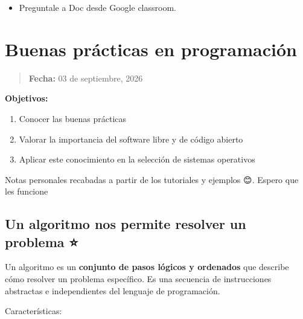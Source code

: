 \documentclass[
  spanish,
  12pt,
  letterpaper,
  DIV=11,
  numbers=noendperiod]{scrreprt}
\providecommand{\tightlist}{%
  \setlength{\itemsep}{0pt}\setlength{\parskip}{0pt}}
\begin{document}
\begin{itemize}
\tightlist
\item
  Preguntale a Doc desde Google classroom.
\end{itemize}

\chapter{Buenas prácticas en
programación}\label{buenas-pruxe1cticas-en-programaciuxf3n}

\begin{quote}
\textbf{Fecha:} 03 de septiembre, 2026
\end{quote}

\textbf{Objetivos:}

\begin{enumerate}
\def\labelenumi{\arabic{enumi}.}
\tightlist
\item
  Conocer las buenas prácticas
\item
  Valorar la importancia del software libre y de código abierto
\item
  Aplicar este conocimiento en la selección de sistemas operativos
\end{enumerate}

Notas personales recabadas a partir de los tutoriales y ejemplos 😊.
Espero que les funcione 💜

\section{\texorpdfstring{\textbf{Un algoritmo nos permite resolver un
problema
⭐}}{Un algoritmo nos permite resolver un problema ⭐}}\label{un-algoritmo-nos-permite-resolver-un-problema}

Un algoritmo es un \textbf{conjunto de pasos lógicos y ordenados} que
describe cómo resolver un problema específico. Es una secuencia de
instrucciones abstractas e independientes del lenguaje de programación.

Características:
\end{document}
